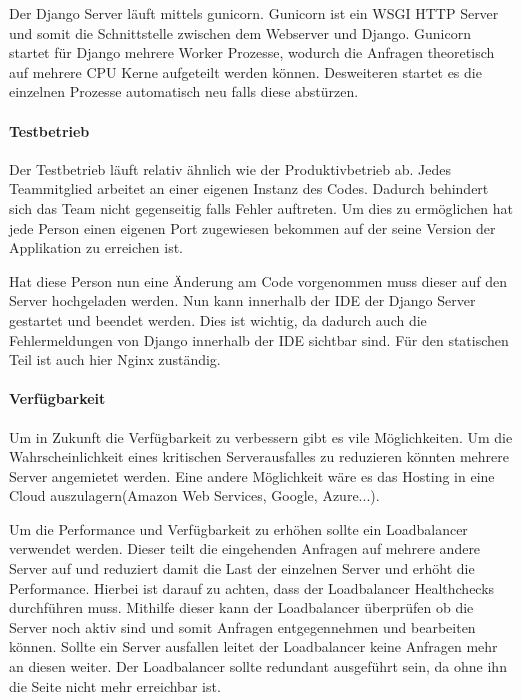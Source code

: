 
Der Django Server läuft mittels gunicorn. Gunicorn ist ein \gls{WSGI} HTTP Server und somit die Schnittstelle zwischen dem Webserver und Django. Gunicorn startet für Django mehrere Worker Prozesse, wodurch die Anfragen theoretisch auf mehrere CPU Kerne aufgeteilt werden können. Desweiteren startet es die einzelnen Prozesse automatisch neu falls diese abstürzen.
\paragraph{Testbetrieb}
Der Testbetrieb läuft relativ ähnlich wie der Produktivbetrieb ab. Jedes Teammitglied arbeitet an einer eigenen Instanz des Codes. Dadurch behindert sich das Team nicht gegenseitig falls Fehler auftreten. Um dies zu ermöglichen hat jede Person einen eigenen Port zugewiesen bekommen auf der seine Version der Applikation zu erreichen ist. 

Hat diese Person nun eine Änderung am Code vorgenommen muss dieser auf den Server hochgeladen werden. Nun kann innerhalb der IDE der Django Server gestartet und beendet werden. Dies ist wichtig, da dadurch auch die Fehlermeldungen von Django innerhalb der \gls{IDE} sichtbar sind. Für den statischen Teil ist auch hier Nginx zuständig.

\paragraph{Verfügbarkeit}
Um in Zukunft die Verfügbarkeit zu verbessern gibt es vile Möglichkeiten. Um die Wahrscheinlichkeit eines kritischen Serverausfalles zu reduzieren könnten mehrere Server angemietet werden. Eine andere Möglichkeit wäre es das Hosting in eine Cloud auszulagern(Amazon Web Services, Google, Azure...). 

Um die Performance und Verfügbarkeit zu erhöhen sollte ein Loadbalancer verwendet werden. Dieser teilt die eingehenden Anfragen auf mehrere andere Server auf und reduziert damit die Last der einzelnen Server und erhöht die Performance. Hierbei ist darauf zu achten, dass der Loadbalancer Healthchecks durchführen muss. Mithilfe dieser kann der Loadbalancer überprüfen ob die Server noch aktiv sind und somit Anfragen entgegennehmen und bearbeiten können. Sollte ein Server ausfallen leitet der Loadbalancer keine Anfragen mehr an diesen weiter. Der Loadbalancer sollte redundant ausgeführt sein, da ohne ihn die Seite nicht mehr erreichbar ist. 


